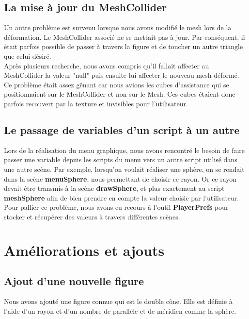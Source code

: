 \documentclass[a4paper,oneside,12pt,titlepage]{article}
\begin{document}
\subsection{La mise à jour du MeshCollider}

Un autre problème est survenu lorsque nous avons modifié le mesh lors de la déformation. Le MeshCollider associé ne se mettait pas à jour. Par conséquent, il était parfois possible de passer à travers la figure et de toucher un autre triangle que celui désiré.\\
Après plusieurs recherche, nous avons compris qu'il fallait affecter au MeshCollider la valeur "null" puis ensuite lui affecter le nouveau mesh déformé.\\

Ce problème était assez gênant car nous avions les cubes d'assistance qui se positionnaient sur le MeshCollider et non sur le Mesh. Ces cubes étaient donc parfois recouvert par la texture et invisibles pour l'utilisateur.


\subsection{Le passage de variables d'un script à un autre}

Lors de la réalisation du menu graphique, nous avons rencontré le besoin de faire passer une variable depuis les scripts du menu vers un autre script utilisé dans une autre scène. Par exemple, lorsqu'on voulait réaliser une sphère, on se rendait dans la scène \textbf{menuSphere}, nous permettant de choisir ce rayon. Or ce rayon devait être transmis à la scène \textbf{drawSphere}, et plus exactement au script \textbf{meshSphere} afin de bien prendre en compte la valeur choisie par l'utilisateur. Pour pallier ce problème, nous avons eu recours à l'outil \textbf{PlayerPrefs} pour stocker et récupérer des valeurs à travers différentes scènes.

\section{Améliorations et ajouts}

\subsection{Ajout d'une nouvelle figure}
Nous avons ajouté une figure connue qui est le double cône. Elle est définie à l'aide d'un rayon et d'un nombre de parallèle et de méridien comme la sphère.
\end{document}
